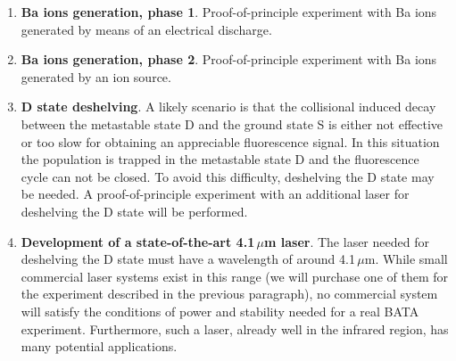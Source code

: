 \begin{enumerate}
	\item \textbf{Ba ions generation, phase 1}. Proof-of-principle experiment with Ba ions generated by means of an electrical discharge.
	
	\item \textbf{Ba ions generation, phase 2}. Proof-of-principle experiment with Ba ions generated by an ion source.	
	
%	
	\item \textbf{D state deshelving}. A likely scenario is that the collisional induced decay between the metastable state D and the ground state S is either not effective or too slow for obtaining an appreciable fluorescence signal. In this situation the population is trapped in the metastable state D and the fluorescence cycle can not be closed. To avoid this difficulty, deshelving the D state may be needed. A proof-of-principle experiment with an additional laser for deshelving the D state will be performed.

\item \textbf{Development of a state-of-the-art 4.1\,$\mu$m laser}. The laser needed for deshelving the D state must have a wavelength of around 4.1\,$\mu$m. While small commercial laser systems exist in this range (we will purchase one of them for the experiment described in the previous paragraph), no commercial system will satisfy the conditions of power and stability needed for a real BATA experiment. Furthermore, such a laser, already well in the infrared region, has many potential applications.

\end{enumerate}

